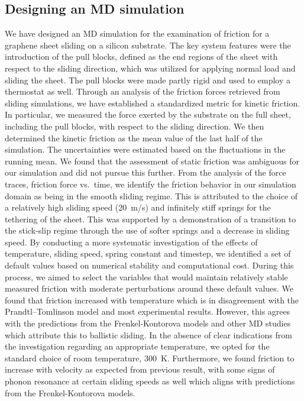 \subsection{Designing an MD simulation}
We have designed an \acrshort{MD} simulation for the examination of friction for
a graphene sheet sliding on a silicon substrate. The key system features were
the introduction of the pull blocks, defined as the end regions of the sheet
with respect to the sliding direction, which was utilized for applying normal
load and sliding the sheet. The pull blocks were made partly rigid and used to
employ a thermostat as well. Through an analysis of the friction forces retrieved from sliding simulations, we have established a standardized metric for kinetic friction. In particular, we measured the force exerted by the substrate on the full sheet, including the pull blocks, with respect to the sliding direction. We then determined the kinetic friction as the mean value of the last half of the simulation. The uncertainties were estimated based on the fluctuations in the running mean. We found that the assessment of static friction was ambiguous for our simulation and did not pursue this further. From the analysis of the
force traces, friction force vs.\ time, we identify the friction behavior in our
simulation domain as being in the smooth sliding regime. This is attributed to the choice of a relatively high sliding speed (\SI{20}{m/s}) and infinitely stiff springs for the tethering of the sheet. This was supported by a demonstration of a transition to the stick-slip regime through the use of softer springs and a decrease in sliding speed. By conducting a more systematic investigation of the
effects of temperature, sliding speed, spring constant and timestep, we identified a set of default values based on numerical stability and computational cost. During this process, we aimed to select the variables that would maintain relatively stable measured friction with moderate perturbations around these default values. We found that friction increased with temperature which is in disagreement with the Prandtl–Tomlinson model and most experimental results. However, this agrees with the predictions from the Frenkel-Kontorova models and other \acrshort{MD} studies which attribute this to ballistic sliding. In the absence of clear indications from the investigation regarding an appropriate temperature, we opted for the standard choice of room temperature, \SI{300}{K}. Furthermore, we found friction to increase with velocity as
expected from previous result, with some signs of phonon resonance at certain sliding speeds as well which aligns with predictions from the Frenkel-Kontorova models.
%
%
%
%


